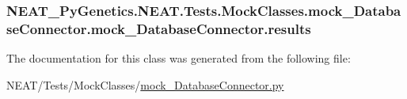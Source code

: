 \subsubsection[{\texorpdfstring{results}{results}}]{\setlength{\rightskip}{0pt plus 5cm}N\+E\+A\+T\+\_\+\+Py\+Genetics.\+N\+E\+A\+T.\+Tests.\+Mock\+Classes.\+mock\+\_\+\+Database\+Connector.\+mock\+\_\+\+Database\+Connector.\+results\hspace{0.3cm}{\ttfamily [static]}}\hypertarget{classNEAT__PyGenetics_1_1NEAT_1_1Tests_1_1MockClasses_1_1mock__DatabaseConnector_1_1mock__DatabaseConnector_a3370fecdccb2abc0c0a3356825f04cc4}{}\label{classNEAT__PyGenetics_1_1NEAT_1_1Tests_1_1MockClasses_1_1mock__DatabaseConnector_1_1mock__DatabaseConnector_a3370fecdccb2abc0c0a3356825f04cc4}


The documentation for this class was generated from the following file\+:\begin{DoxyCompactItemize}
\item 
N\+E\+A\+T/\+Tests/\+Mock\+Classes/\hyperlink{mock__DatabaseConnector_8py}{mock\+\_\+\+Database\+Connector.\+py}\end{DoxyCompactItemize}
